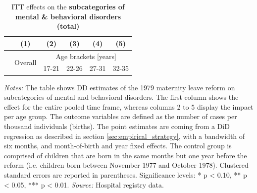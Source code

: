 \documentclass[11pt, a4paper]{article} %
\begin{document}
\newpage
{} 
\vspace*{\fill}
\begin{table}[H] \centering 
	\begin{threeparttable} \centering \caption{ITT effects on the \textbf{subcategories of mental \& behavioral disorders (total)}}\label{tab: ITT_across_d5subcategories_per_age_group_total}
		{\def\sym#1{\ifmmode^{#1}\else\(^{#1}\)\fi} 
			\begin{tabular}{l*{5}{c}}
				\toprule 
				&\multicolumn{1}{c}{(1)}&\multicolumn{1}{c}{(2)}&\multicolumn{1}{c}{(3)}&\multicolumn{1}{c}{(4)}&\multicolumn{1}{c}{(5)}\\
				\midrule
				&\multirow{2}{*}{Overall} & \multicolumn{4}{c}{Age brackets [years]} \\ 
				\cmidrule(lr){3-6}
				&&\multicolumn{1}{c}{17-21}&\multicolumn{1}{c}{22-26}&\multicolumn{1}{c}{27-31}&\multicolumn{1}{c}{32-35}\\
				
				\midrule
				
				
				
				\bottomrule 
		\end{tabular}}
	\end{threeparttable} 
	\begin{minipage}{0.9\linewidth}
		\scriptsize \emph{Notes:} The table shows DD estimates of the 1979 maternity leave reform on subcategories of mental and behavioral disorders. The first column shows the effect for the entire pooled time frame, whereas columns 2 to 5 display the impact per age group. The outcome variables are defined as the number of cases per thousand individuals (births). The point estimates are coming from a DiD regression as described in section \ref{sec:empirical_strategy}, with a bandwidth of six months, and month-of-birth and year fixed effects. The control group is comprised of children that are born in the same months but one year before the reform (i.e. children born between November 1977 and October 1978). Clustered standard errors are reported in parentheses. \newline Significance levels: * p < 0.10, ** p < 0.05, *** p < 0.01. \newline 	\emph{Source:} Hospital registry data.
	\end{minipage}
\end{table} 
\vspace*{\fill}\clearpage 
\restoregeometry
\newpage
{} 

\restoregeometry
\end{document}
